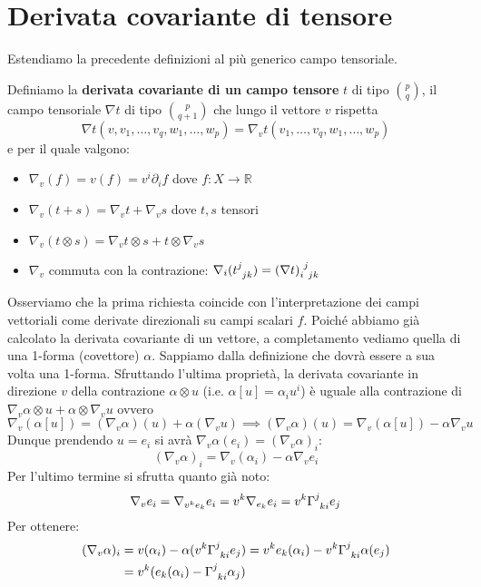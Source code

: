 \section{Derivata covariante di tensore}
Estendiamo la precedente definizioni al più generico campo tensoriale.
\begin{definizione}
Definiamo la \textbf{derivata covariante di un campo tensore} $t$ di tipo $\binom{p}{q}$, il campo tensoriale $\nabla t$ di tipo $\binom{p}{q+1}$ che lungo il vettore $v$ rispetta
\begin{equation*}
    \nabla t (v, v_1, \dots, v_q, w_1, \dots, w_p) = \nabla_v t( v_1, \dots, v_q, w_1, \dots, w_p)
\end{equation*}
e per il quale valgono:
\begin{itemize}
    \item $\nabla_v (f) = v(f) = v^i\partial_i f$ dove $f:X \rightarrow \mathbb{R}$
    \item $\nabla_v (t+s)= \nabla_v t + \nabla_v s$ dove $t,s$ tensori
    \item $\nabla_v(t \otimes s)= \nabla_v t \otimes s + t \otimes \nabla_v s$
    \item $\nabla_v$ commuta con la contrazione: $\nabla_i (\tensor{t}{^j_{jk}}) = \tensor{(\nabla t)}{_i^j_{jk}}$
\end{itemize}
\end{definizione}
Osserviamo che la prima richiesta coincide con l'interpretazione dei campi vettoriali come derivate direzionali su campi scalari $f$.
Poiché abbiamo già calcolato la derivata covariante di un vettore, a completamento vediamo quella di una 1-forma (covettore) $\alpha$. Sappiamo dalla definizione che dovrà essere a sua volta una 1-forma.
Sfruttando l'ultima proprietà, la derivata covariante in direzione $v$ della contrazione $\alpha \otimes u$ (i.e. $\alpha[u]=\alpha_i u^i$) è uguale alla contrazione di $\nabla_v \alpha \otimes u + \alpha \otimes \nabla_v u$ ovvero
\begin{equation*}
    \nabla_v (\alpha[u]) = (\nabla_v \alpha)(u) + \alpha(\nabla_v u) \implies (\nabla_v \alpha)(u) = \nabla_v(\alpha[u]) - \alpha \nabla_v u
\end{equation*}
Dunque prendendo $u= e_i$ si avrà $\nabla_v\alpha (e_i) = (\nabla_v \alpha)_i$:
\begin{equation*}
    (\nabla_v \alpha)_i = \nabla_v (\alpha_i) - \alpha\nabla_v e_i
\end{equation*}
Per l'ultimo termine si sfrutta quanto già noto:
\begin{equation*}
    \nabla_v e_i =\nabla_{v^ke_k} e_i = v^k\nabla_{e_k}e_i = v^k \tensor{\Gamma}{^j_{ki}}e_j
\end{equation*}
Per ottenere:
\begin{align*}
    (\nabla_v \alpha)_i &= v(\alpha_i) - \alpha(v^k \tensor{\Gamma}{^j_{ki}}e_j)
    = v^ke_k(\alpha_i) - v^k \tensor{\Gamma}{^j_{ki}}\alpha(e_j)\\
    &= v^k(e_k(\alpha_i) - \tensor{\Gamma}{^j_{ki}}\alpha_j)
\end{align*}

